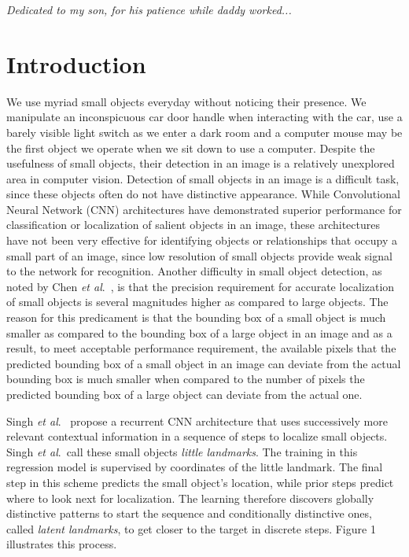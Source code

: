 \documentclass [11pt,letterpaper ,twoside ,openany ]{report}
\begin{document}
    \tableofcontents
    \listoffigures
    \listoftables

    \newpage
    \begin{center}
      \Large
      \vspace*{\fill}
      \textit{Dedicated to my son, for his patience while daddy worked...}
      \vspace*{\fill}
    \end{center}    


    \chapter{Introduction}
    \doublespacing
    We use myriad small objects everyday without noticing their presence. We manipulate an inconspicuous car door handle when interacting with the car, use a barely visible light switch as we enter a dark room and a computer mouse may be the first object we operate when we sit down to use a computer. Despite the usefulness of small objects, their detection in an image is a relatively unexplored area in computer vision. Detection of small objects in an image is a difficult task, since these objects often do not have distinctive appearance. While Convolutional Neural Network (CNN) architectures have demonstrated superior performance for classification or localization of salient objects in an image, these architectures have not been very effective for identifying objects or relationships that occupy a small part of an image, since low resolution of small objects provide weak signal to the network for recognition. Another difficulty in small object detection, as noted by Chen \textit{et al}.\ \cite{chen2016r}, is that the precision requirement for accurate localization of small objects is several magnitudes higher as compared to large objects. The reason for this predicament is that the bounding box of a small object is much smaller as compared to the bounding box of a large object in an image and as a result, to meet acceptable performance requirement, the available pixels that the predicted bounding box of a small object in an image can deviate from the actual bounding box is much smaller when compared to the number of pixels the predicted bounding box of a large object can deviate from the actual one.

    Singh \textit{et al}.\ \cite{Singh_2016_CVPR} propose a recurrent CNN architecture that uses successively more relevant contextual information in a sequence of steps to localize small objects. Singh \textit{et al}.\ call these small objects \textit{little landmarks}. The training in this regression model is supervised by coordinates of the little landmark. The final step in this scheme predicts the small object's location, while prior steps predict where to look next for localization. The learning therefore discovers globally distinctive patterns to start the sequence and conditionally distinctive ones, called \textit {latent landmarks}, to get closer to the target in discrete steps. Figure 1 illustrates this process.
\end{document}
